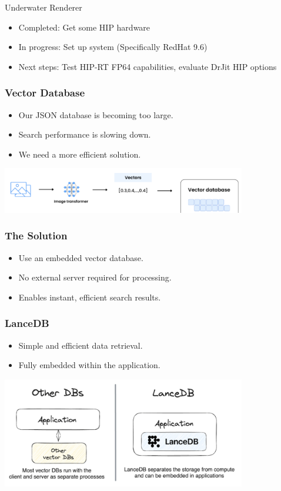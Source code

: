 \begin{frame}{Underwater Renderer}
    \begin{itemize}
        \item Completed: Get some HIP hardware
        \item In progress: Set up system (Specifically RedHat 9.6)
        \item Next steps: Test HIP-RT FP64 capabilities, evaluate DrJit HIP options
    \end{itemize}    
\end{frame}

\begin{frame}
    \frametitle{Vector Database}
    \begin{itemize}
        \item Our JSON database is becoming too large.
        \item Search performance is slowing down.
        \item We need a more efficient solution.
    \end{itemize}
    \vspace{0.5cm}
    \centering
    \includegraphics[width=0.8\textwidth, keepaspectratio]{images/Vectordb.png}
\end{frame}

\begin{frame}
    \frametitle{The Solution}
    \begin{itemize}
        \item Use an embedded vector database.
        \item No external server required for processing.
        \item Enables instant, efficient search results.
    \end{itemize}
\end{frame}

\begin{frame}
    \frametitle{LanceDB}
    \begin{itemize}
        \item Simple and efficient data retrieval.
        \item Fully embedded within the application.
    \end{itemize}
    \vspace{0.5cm}
    \centering
    \includegraphics[width=0.8\textwidth, keepaspectratio]{images/vdbdiffernce.png}
\end{frame}

